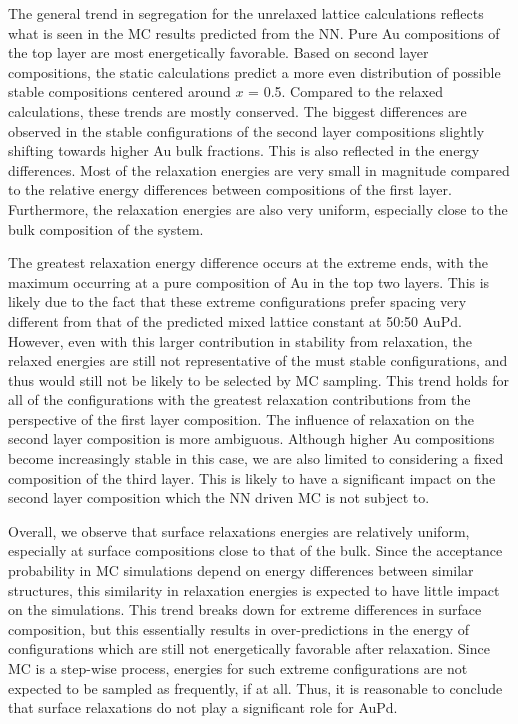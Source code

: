 \documentclass[12pt,oneside]{cmuthesis}
\begin{document}
The general trend in segregation for the unrelaxed lattice calculations reflects what is seen in the MC results predicted from the NN. Pure Au compositions of the top layer are most energetically favorable. Based on second layer compositions, the static calculations predict a more even distribution of possible stable compositions centered around \(x\) = 0.5. Compared to the relaxed calculations, these trends are mostly conserved. The biggest differences are observed in the stable configurations of the second layer compositions slightly shifting towards higher Au bulk fractions. This is also reflected in the energy differences. Most of the relaxation energies are very small in magnitude compared to the relative energy differences between compositions of the first layer. Furthermore, the relaxation energies are also very uniform, especially close to the bulk composition of the system.

The greatest relaxation energy difference occurs at the extreme ends, with the maximum occurring at a pure composition of Au in the top two layers. This is likely due to the fact that these extreme configurations prefer spacing very different from that of the predicted mixed lattice constant at 50:50 AuPd. However, even with this larger contribution in stability from relaxation, the relaxed energies are still not representative of the must stable configurations, and thus would still not be likely to be selected by MC sampling. This trend holds for all of the configurations with the greatest relaxation contributions from the perspective of the first layer composition. The influence of relaxation on the second layer composition is more ambiguous. Although higher Au compositions become increasingly stable in this case, we are also limited to considering a fixed composition of the third layer. This is likely to have a significant impact on the second layer composition which the NN driven MC is not subject to.

Overall, we observe that surface relaxations energies are relatively uniform, especially at surface compositions close to that of the bulk. Since the acceptance probability in MC simulations depend on energy differences between similar structures, this similarity in relaxation energies is expected to have little impact on the simulations. This trend breaks down for extreme differences in surface composition, but this essentially results in over-predictions in the energy of configurations which are still not energetically favorable after relaxation. Since MC is a step-wise process, energies for such extreme configurations are not expected to be sampled as frequently, if at all. Thus, it is reasonable to conclude that surface relaxations do not play a significant role for AuPd.
\end{document}
